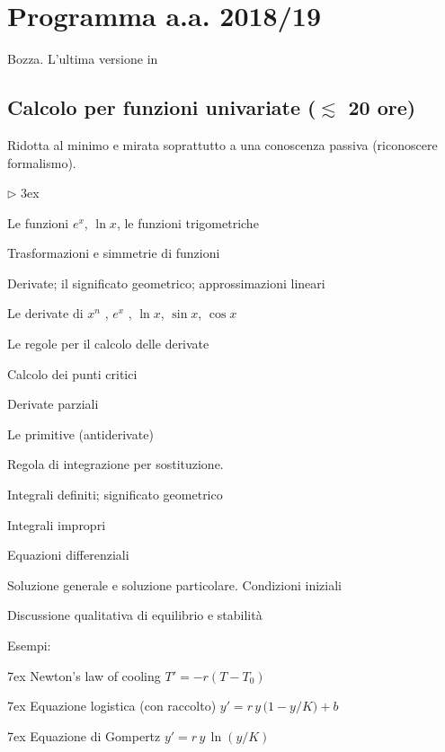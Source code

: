 \documentclass[10pt]{article}
\newcommand{\mylabel}[1]{#1\hfill}
\renewenvironment{itemize}
  {\begin{list}{$\triangleright$}{%
   \baselineskip3ex
   \setlength{\parskip}{4mm}
   \setlength{\topsep}{.4\baselineskip}
   \setlength{\rightmargin}{0mm}
   \setlength{\listparindent}{0mm}
   \setlength{\itemindent}{0mm}
   \setlength{\labelwidth}{2ex}
   \setlength{\itemsep}{.4\baselineskip}
   \setlength{\parsep}{0mm}
   \setlength{\partopsep}{0mm}
   \setlength{\labelsep}{1ex}
   \setlength{\leftmargin}{\labelwidth+\labelsep}
   \let\makelabel\mylabel}}{%
   \end{list}\vspace*{-1.3mm}}
\begin{document}
\section{Programma a.a. 2018/19}

\colorbox{blue!10}{\begin{minipage}{\textwidth}
Bozza. L'ultima versione in


\end{minipage}}


\subsection{Calcolo per funzioni univariate (\boldmath$\lesssim$ 20 ore)}

\colorbox{blue!10}{\begin{minipage}{\textwidth}
Ridotta al minimo e mirata soprattutto a una conoscenza passiva (riconoscere formalismo). 
\end{minipage}}



\begin{itemize}
\item Le funzioni $e^x$, $\ln x$, le funzioni trigometriche

\item Trasformazioni e simmetrie di funzioni

\item Derivate; il significato geometrico; approssimazioni lineari

      Le derivate di $x^n$ , $e^x$ , $\ln x$, $\sin x$, $\cos x$\hfill{}

      Le regole per il calcolo delle derivate\hfill{}
      
      Calcolo dei punti critici

      Derivate parziali\hfill{}
      
\item Le primitive (antiderivate)

Regola di integrazione per sostituzione.\hfill{}

Integrali definiti; significato geometrico

Integrali impropri

\item Equazioni differenziali \hfill{}

  Soluzione generale e soluzione particolare. Condizioni iniziali
  
  Discussione qualitativa di equilibrio e stabilità
  
  Esempi:\hfill{} 
  
  \noindent\kern7ex Newton's law of cooling $T' = -r(T-T_0)$
  
  \noindent\kern7ex Equazione logistica (con raccolto) $y' = r\, y\,\big(1- y/K\big) + b$
  
  \noindent\kern7ex Equazione di Gompertz $y' = r\, y\,\ln(y/K)$
\end{itemize}
\end{document}
